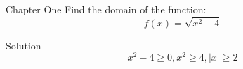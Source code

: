 \documentclass[9pt]{beamer}
\begin{document}
\begin{frame}{Chapter One}
Find the domain of the function:
\[  f(x)=\sqrt{x^{2}-4}\]
\pause
\begin{block}{Solution}
\[x^{2}-4 \geq 0, x^{2}\geq 4, |x|\geq 2\]
\end{block}
\end{frame}
\end{document}
